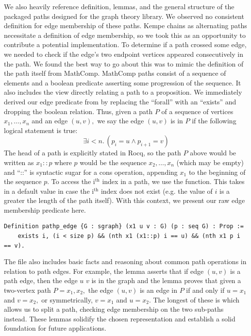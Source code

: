 We also heavily reference definition, lemmas, and the general structure of the packaged paths designed for the graph theory library. We observed no consistent definition for edge membership of these paths. Kempe chains as alternating paths necessitate a definition of edge membership, so we took this as an opportunity to contribute a potential implementation. To determine if a path crossed some edge, we needed to check if the edge's two endpoint vertices appeared consecutively in the path. We found the best way to go about this was to mimic the definition of the path itself from MathComp. MathComp paths consist of a sequence of elements and a boolean predicate asserting some progression of the sequence. It also includes the view  directly relating a path to a proposition. We immediately derived our edge predicate from  by replacing the ``forall'' with an ``exists'' and dropping the boolean relation. Thus, given a path $P$ of a sequence of vertices $x_1, \dots, x_n$ and an edge $(u, v),$ we say the edge $(u, v)$ is in $P$ if the following logical statement is true:
$$
\exists i < n.\, (p_i = u \wedge p_{i+1} = v)
$$
The head of a path is explicitly stated in Rocq, so the path $P$ above would be written as $x_1 :: p$ where $p$ would be the sequence $x_2, \dots, x_n$ (which may be empty) and ``::'' is syntactic sugar for a cons operation, appending $x_1$ to the beginning of the sequence $p$. To access the i$^{\text{th}}$ index in a path, we use the  function. This takes in a default value in case the i$^{\text{th}}$ index does not exist (e.g. the value of $i$ is a greater the length of the path itself). With this context, we present our raw edge membership predicate here.
\begin{verbatim}
Definition pathp_edge {G : sgraph} (x1 u v : G) (p : seq G) : Prop :=
    exists i, (i < size p) && (nth x1 (x1::p) i == u) && (nth x1 p i == v).
\end{verbatim}
The file  also includes basic facts and reasoning about common path operations in relation to path edges. For example, the lemma  asserts that if edge $(u, v)$ is a path edge, then the edge $u$ \fxn{--} $v$ is in the graph and the lemma  proves that given a two-vertex path $P = x_1, x_2,$ the edge $(u, v)$ is an edge in $P$ if and only if $u = x_1$ and $v = x_2,$ or symmetrically, $v = x_1$ and $u = x_2.$ The longest of these is  which allows us to split a path, checking edge membership on the two sub-paths instead. These lemmas solidify the chosen representation and establish a solid foundation for future applications.
